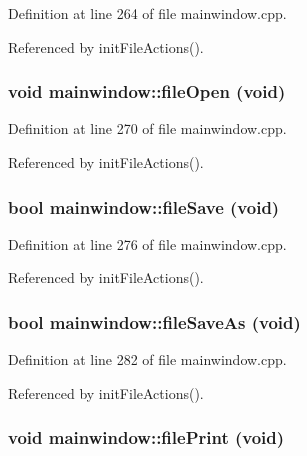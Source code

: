 Definition at line 264 of file mainwindow.cpp.

Referenced by init\-File\-Actions().
\subsubsection{\setlength{\rightskip}{0pt plus 5cm}void mainwindow::file\-Open (void)\hspace{0.3cm}{\tt  [private, slot]}}\label{classmainwindow_881a54e18200f7b3812f84cb76362322}




Definition at line 270 of file mainwindow.cpp.

Referenced by init\-File\-Actions().
\subsubsection{\setlength{\rightskip}{0pt plus 5cm}bool mainwindow::file\-Save (void)\hspace{0.3cm}{\tt  [private, slot]}}\label{classmainwindow_266ed66c32e6c31a329fe64cefac8bab}




Definition at line 276 of file mainwindow.cpp.

Referenced by init\-File\-Actions().
\subsubsection{\setlength{\rightskip}{0pt plus 5cm}bool mainwindow::file\-Save\-As (void)\hspace{0.3cm}{\tt  [private, slot]}}\label{classmainwindow_2fe00a916b7e48fa9fef40d8032eac6b}




Definition at line 282 of file mainwindow.cpp.

Referenced by init\-File\-Actions().
\subsubsection{\setlength{\rightskip}{0pt plus 5cm}void mainwindow::file\-Print (void)\hspace{0.3cm}{\tt  [private, slot]}}\label{classmainwindow_dfd16a7e4ae01e08bb546388f9cf969d}




